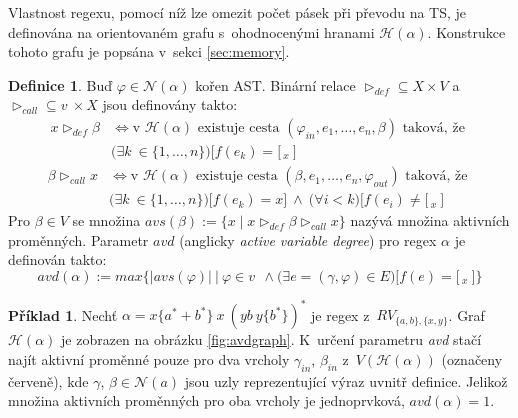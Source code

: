 \documentclass[thesis=B,czech]{FITthesis}[2019/12/23]
\theoremstyle{definition}
\newtheorem{definition}{Definice}[chapter]
\newtheorem{example}{Příklad}[chapter]
\begin{document}
Vlastnost regexu, pomocí níž lze omezit počet pásek při převodu na TS, je definována na orientovaném grafu s~ohodnocenými hranami $\mathcal{H}(\alpha)$. Konstrukce tohoto grafu je popsána v~sekci \ref{sec:memory}.

\begin{definition}
Buď $\varphi \in \mathcal{N}(\alpha)$ kořen AST. Binární relace $\triangleright_{def} \subseteq X \times V$ a $\triangleright_{call} \subseteq v~\times X$ jsou definovány takto:
\begin{equation}\begin{split} x \triangleright_{def} \beta &\iff \text{v $\mathcal{H}(\alpha)$ existuje cesta }  (\varphi_{in}, e_1, \dots, e_n, \beta) \text{ taková, že } \\ &\bigg(\exists k~\in \{1, \dots, n\}\bigg) \bigg [ f(e_k)=[\,_x \ \bigg] \end{split}\end{equation}
\begin{equation}\begin{split} \beta \triangleright_{call} x &\iff \text{v $\mathcal{H}(\alpha)$ existuje cesta }  (\beta, e_1, \dots, e_n, \varphi_{out}) \text{ taková, že } \\ &\bigg(\exists k~\in \{1, \dots, n\}\bigg) \bigg [ f(e_k)=x \bigg ] \ \wedge \ \bigg(\forall i < k\bigg) \bigg[ f(e_i)\ne [\,_x \ \bigg] \end{split}\end{equation}
Pro $\beta \in V$ se množina $avs(\beta):=\{x \mid x \triangleright_{def} \beta \triangleright_{call} x\}$ nazývá množina aktivních proměnných. 
Parametr $avd$ (anglicky \emph{active variable degree}) pro regex $\alpha$ je definován takto: \cite{schmidref}
\begin{equation} avd(\alpha) := max\bigg\{|avs(\varphi)| \ \bigg | \ \varphi \in v~\ \wedge \bigg (
\exists e = (\gamma, \varphi) \in E \bigg ) \bigg [ f(e)=[\,_x \ \bigg] \bigg\}\end{equation}
\end{definition}

\begin{example} Nechť $\alpha = x\{a^\ast+b^\ast\} \ x \ (yb \ y \{b^\ast\})^\ast$ je regex z~$RV_{\{a, b\},\{x, y\}}$. Graf $\mathcal{H}(\alpha)$ je zobrazen na obrázku \ref{fig:avdgraph}. K~určení parametru \emph{avd} stačí najít aktivní proměnné pouze pro dva vrcholy $\gamma_{in}$, $\beta_{in}$ z~$V(\mathcal{H}(\alpha))$ (označeny červeně), kde $\gamma$, $\beta \in \mathcal{N}(a)$ jsou uzly reprezentující výraz uvnitř definice. Jelikož množina aktivních proměnných pro oba vrcholy je jednoprvková, $avd(\alpha) = 1$.
\end{example}
\end{document}

